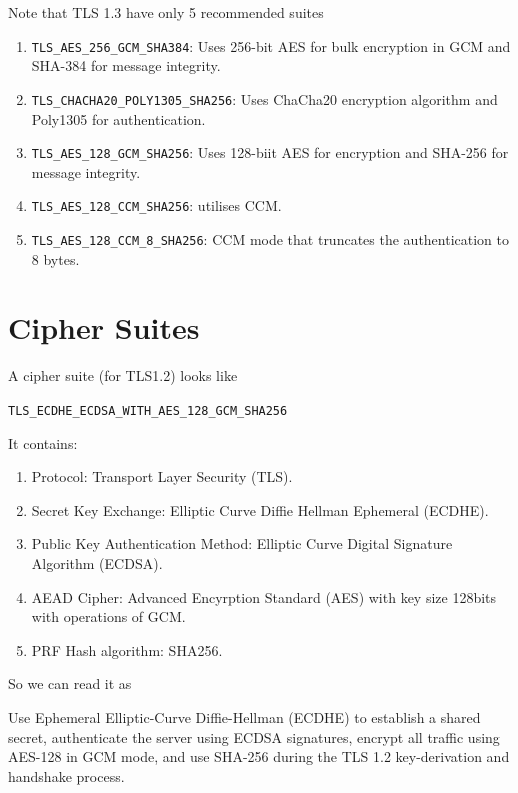 \documentclass[a4paper, 12pt]{book} %
\begin{document}
Note that TLS  1.3 have only 5 recommended suites
\begin{enumerate}
    \item \verb|TLS_AES_256_GCM_SHA384|: Uses 256-bit AES for bulk encryption in GCM and SHA-384 for message integrity.
    \item \verb|TLS_CHACHA20_POLY1305_SHA256|: Uses ChaCha20 encryption algorithm and Poly1305 for authentication.
    \item \verb|TLS_AES_128_GCM_SHA256|: Uses 128-biit AES for encryption and SHA-256 for message integrity.
    \item \verb|TLS_AES_128_CCM_SHA256|: utilises CCM.
    \item \verb|TLS_AES_128_CCM_8_SHA256|: CCM mode that truncates the authentication to 8 bytes.
\end{enumerate}







\section{Cipher Suites}

A cipher suite (for TLS1.2) looks like
\begin{center}
        \verb|TLS_ECDHE_ECDSA_WITH_AES_128_GCM_SHA256|    
\end{center}
It contains:
\begin{enumerate}
    \item Protocol: Transport Layer Security (TLS).
    \item Secret Key Exchange: Elliptic Curve Diffie Hellman Ephemeral (ECDHE).
    \item Public Key Authentication Method: Elliptic Curve Digital Signature Algorithm (ECDSA).
    \item AEAD Cipher: Advanced Encyrption Standard (AES) with key size 128bits with operations of GCM.
    \item PRF Hash algorithm: SHA256.
\end{enumerate}
So we can read it as 
\begin{center}
    Use Ephemeral Elliptic-Curve Diffie-Hellman (ECDHE) to establish a shared secret, authenticate the server using ECDSA signatures, encrypt all traffic using AES-128 in GCM mode, and use SHA-256 during the TLS 1.2 key-derivation and handshake process.
\end{center}
\end{document}
